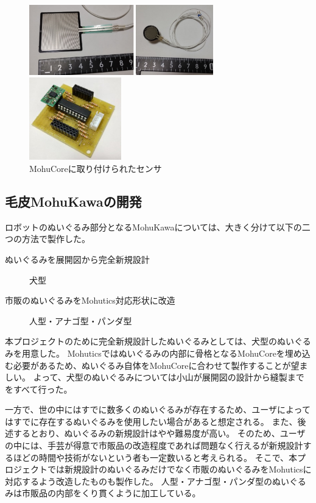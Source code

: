 \documentclass[uplatex,a4paper,12pt]{jsarticle}
\begin{document}
\begin{figure}[htbp]
  \centering
  \begin{minipage}[c]{0.64\linewidth}
    \centering
    \includegraphics[keepaspectratio,width=8cm,clip]{images/mohucore/touch_sensor.png}
  \end{minipage}
  \begin{minipage}[c]{0.32\linewidth}
    \centering
    \includegraphics[keepaspectratio,width=4cm,clip]{images/mohucore/sensor_board.jpg}
  \end{minipage}
  \caption{MohuCoreに取り付けられたセンサ}
  \label{fig:mohucore:sensor}
\end{figure}


\subsection{毛皮MohuKawaの開発}

ロボットのぬいぐるみ部分となるMohuKawaについては、大きく分けて以下の二つの方法で製作した。
\begin{description}
  \item[ぬいぐるみを展開図から完全新規設計]犬型
  \item[市販のぬいぐるみをMohutics対応形状に改造]人型・アナゴ型・パンダ型  
\end{description}

本プロジェクトのために完全新規設計したぬいぐるみとしては、犬型のぬいぐるみを用意した。
Mohuticsではぬいぐるみの内部に骨格となるMohuCoreを埋め込む必要があるため、ぬいぐるみ自体をMohuCoreに合わせて製作することが望ましい。
よって、犬型のぬいぐるみについては小山が展開図の設計から縫製までをすべて行った。

一方で、世の中にはすでに数多くのぬいぐるみが存在するため、ユーザによってはすでに存在するぬいぐるみを使用したい場合があると想定される。
また、後述するとおり、ぬいぐるみの新規設計はやや難易度が高い。
そのため、ユーザの中には、手芸が得意で市販品の改造程度であれば問題なく行えるが新規設計するほどの時間や技術がないという者も一定数いると考えられる。
そこで、本プロジェクトでは新規設計のぬいぐるみだけでなく市販のぬいぐるみをMohuticsに対応するよう改造したものも製作した。
人型・アナゴ型・パンダ型のぬいぐるみは市販品の内部をくり貫くように加工している。
\end{document}
